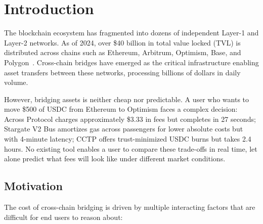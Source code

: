 \section{Introduction}\label{sec: intro}

The blockchain ecosystem has fragmented into dozens of independent Layer-1 and Layer-2 networks. As of 2024, over \$40 billion in total value locked (TVL) is distributed across chains such as Ethereum, Arbitrum, Optimism, Base, and Polygon~\cite{defillama}. Cross-chain bridges have emerged as the critical infrastructure enabling asset transfers between these networks, processing billions of dollars in daily volume.

However, bridging assets is neither cheap nor predictable. A user who wants to move \$500 of USDC from Ethereum to Optimism faces a complex decision: Across Protocol charges approximately \$3.33 in fees but completes in 27 seconds; Stargate V2 Bus amortizes gas across passengers for lower absolute costs but with 4-minute latency; CCTP offers trust-minimized USDC burns but takes 2.4 hours. No existing tool enables a user to compare these trade-offs in real time, let alone predict what fees will look like under different market conditions.

\subsection{Motivation}\label{sec: motivation}

The cost of cross-chain bridging is driven by multiple interacting factors that are difficult for end users to reason about:

